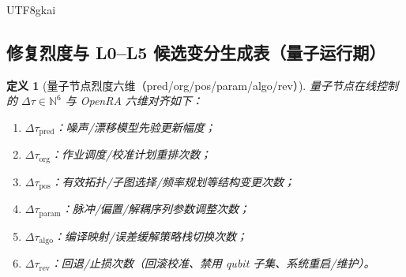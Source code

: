 \documentclass[12pt]{article}
\newtheorem{definition}{定义}[section]
\newcommand{\NN}{\mathbb{N}}
\begin{document}
\begin{CJK*}{UTF8}{gkai}
\subsection{修复烈度与 L0--L5 候选变分生成表（量子运行期）}
\label{sec:online-qpu-tau-and-tower}

\begin{definition}[量子节点烈度六维（pred/org/pos/param/algo/rev）]
\label{def:online-qpu-tau}
量子节点在线控制的 $\Delta\tau\in\NN^6$ 与 OpenRA 六维对齐如下：
\begin{enumerate}
  \item $\Delta\tau_{\mathrm{pred}}$：噪声/漂移模型先验更新幅度；
  \item $\Delta\tau_{\mathrm{org}}$：作业调度/校准计划重排次数；
  \item $\Delta\tau_{\mathrm{pos}}$：有效拓扑/子图选择/频率规划等结构变更次数；
  \item $\Delta\tau_{\mathrm{param}}$：脉冲/偏置/解耦序列参数调整次数；
  \item $\Delta\tau_{\mathrm{algo}}$：编译映射/误差缓解策略栈切换次数；
  \item $\Delta\tau_{\mathrm{rev}}$：回退/止损次数（回滚校准、禁用 qubit 子集、系统重启/维护）。
\end{enumerate}
\end{definition}


\end{CJK*}
\end{document}
